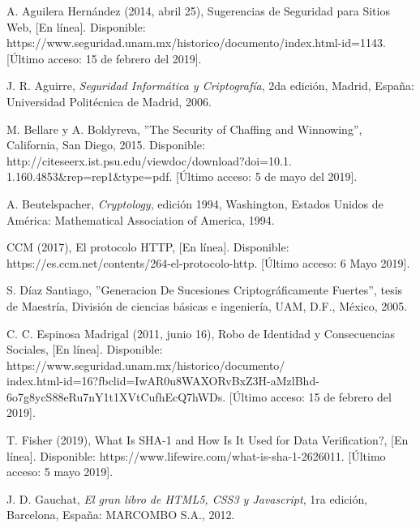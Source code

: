 \documentclass[12pt, a4paper, titlepage]{report}
\begin{document}
	\newpage

    \begin{thebibliography}{20}
       
		A. Aguilera Hernández (2014, abril 25), Sugerencias de Seguridad para Sitios Web, [En línea]. Disponible: https://www.seguridad.unam.mx/historico/documento/index.html-id=1143. [Último acceso: 15 de febrero del 2019].
	    
        J. R. Aguirre, \textit{Seguridad Informática y Criptografía}, 2da edición, Madrid, España: Universidad Politécnica de Madrid, 2006.
	    
		M. Bellare y A. Boldyreva, ''The Security of Chaffing and Winnowing'', California, San Diego, 2015. Disponible: http://citeseerx.ist.psu.edu/viewdoc/download?doi=10.1.\\1.160.4853\&rep=rep1\&type=pdf. [Último acceso: 5 de mayo del 2019].
	
		A. Beutelspacher, \textit{Cryptology}, edición 1994, Washington, Estados Unidos de América: Mathematical Association of America, 1994.
	
        CCM (2017), El protocolo HTTP, [En línea]. Disponible: https://es.ccm.net/contents/264-el-protocolo-http. [Último acceso: 6 Mayo 2019].

        S. Díaz Santiago, ''Generacion De Sucesiones Criptográficamente Fuertes'', tesis de Maestría, División de ciencias básicas e ingeniería, UAM, D.F., México, 2005.
		
		C. C. Espinosa Madrigal (2011, junio 16), Robo de Identidad y Consecuencias Sociales, [En línea]. Disponible: https://www.seguridad.unam.mx/historico/documento/\\index.html-id=16?fbclid=IwAR0u8WAXORvBxZ3H-aMzlBhd-6o7g8ycS88eRu7nY1t1XVtCufhEcQ7hWDs. [Último acceso: 15 de febrero del 2019].
		
        T. Fisher (2019), What Is SHA-1 and How Is It Used for Data Verification?, [En línea]. Disponible: https://www.lifewire.com/what-is-sha-1-2626011. [Último acceso: 5 mayo 2019].
		
		J. D. Gauchat, \textit{El gran libro de HTML5, CSS3 y Javascript}, 1ra edición, Barcelona, España: MARCOMBO S.A., 2012. 
		

\end{thebibliography}
\end{document}
